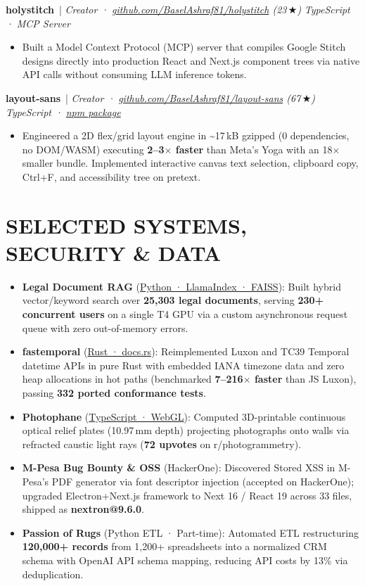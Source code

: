 \documentclass[10pt,letterpaper]{article}
\newcommand{\resumeItem}[1]{\item\small{#1}}
\newcommand{\resumeHeading}[3]{
  \vspace{1.5pt}
  {\textbf{#1}}~{\color{accent}|} \textit{#2} \hfill \textit{\small #3}
  \vspace{0pt}
}
\begin{document}
\resumeHeading{holystitch}{Creator · \href{https://github.com/BaselAshraf81/holystitch}{github.com/BaselAshraf81/holystitch} (23\,\(\bigstar\))}{TypeScript · MCP Server}
\begin{itemize}
  \resumeItem{Built a Model Context Protocol (MCP) server that compiles Google Stitch designs directly into production React and Next.js component trees via native API calls without consuming LLM inference tokens.}
\end{itemize}

\resumeHeading{layout-sans}{Creator · \href{https://github.com/BaselAshraf81/layout-sans}{github.com/BaselAshraf81/layout-sans} (67\,\(\bigstar\))}{TypeScript · \href{https://www.npmjs.com/package/layout-sans}{npm package}}
\begin{itemize}
  \resumeItem{Engineered a 2D flex/grid layout engine in \textasciitilde17\,kB gzipped (0 dependencies, no DOM/WASM) executing \textbf{2--3\(\times\) faster} than Meta's Yoga with an 18\(\times\) smaller bundle. Implemented interactive canvas text selection, clipboard copy, Ctrl+F, and accessibility tree on pretext.}
\end{itemize}

\section*{SELECTED SYSTEMS, SECURITY \& DATA}

\begin{itemize}
  \resumeItem{\textbf{Legal Document RAG} (\href{https://github.com/BaselAshraf81/epstein-rag-abliterated-llm}{Python · LlamaIndex · FAISS}): Built hybrid vector/keyword search over \textbf{25,303 legal documents}, serving \textbf{230+ concurrent users} on a single T4 GPU via a custom asynchronous request queue with zero out-of-memory errors.}
  \resumeItem{\textbf{fastemporal} (\href{https://docs.rs/fastemporal}{Rust · docs.rs}): Reimplemented Luxon and TC39 Temporal datetime APIs in pure Rust with embedded IANA timezone data and zero heap allocations in hot paths (benchmarked \textbf{7--216\(\times\) faster} than JS Luxon), passing \textbf{332 ported conformance tests}.}
  \resumeItem{\textbf{Photophane} (\href{https://github.com/BaselAshraf81/photophane}{TypeScript · WebGL}): Computed 3D-printable continuous optical relief plates (10.97\,mm depth) projecting photographs onto walls via refracted caustic light rays (\textbf{72 upvotes} on r/photogrammetry).}
  \resumeItem{\textbf{M-Pesa Bug Bounty \& OSS} (HackerOne): Discovered Stored XSS in M-Pesa's PDF generator via font descriptor injection (accepted on HackerOne); upgraded Electron+Next.js framework to Next 16 / React 19 across 33 files, shipped as \textbf{nextron@9.6.0}.}
  \resumeItem{\textbf{Passion of Rugs} (Python ETL · Part-time): Automated ETL restructuring \textbf{120,000+ records} from 1,200+ spreadsheets into a normalized CRM schema with OpenAI API schema mapping, reducing API costs by 13\% via deduplication.}
\end{itemize}
\end{document}
